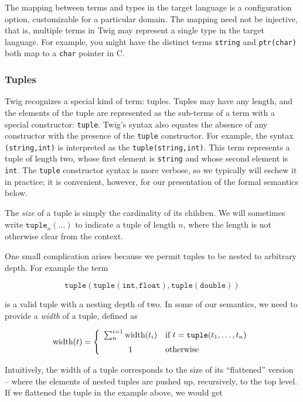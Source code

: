 The mapping between terms and types in the target language is a
configuration option, customizable for a particular domain. The
mapping need not be injective, that is, multiple terms in Twig may
represent a single type in the target language. For example, you
might have the distinct terms \texttt{string} and
\texttt{ptr(char)} both map to a \texttt{char} pointer in C.

\subsubsection{Tuples}

Twig recognizes a special kind of term: tuples. Tuples may have
any length, and the elements of the tuple are represented as the
sub-terms of a term with a special constructor: \texttt{tuple}.
Twig's syntax also equates the absence of any constructor with the
presence of the \texttt{tuple} constructor. For example, the
syntax \texttt{(string,int)} is interpreted as the
\texttt{tuple(string,int)}. This term represents a tuple of length
two, whose first element is \texttt{string} and whose second
element is \texttt{int}. The \texttt{tuple} constructor syntax is
more verbose, so we typically will eschew it in practice; it is
convenient, however, for our presentation of the formal semantics
below.

The \emph{size} of a tuple is simply the cardinality of its
children. We will sometimes write $\mathtt{tuple}_n(\ldots)$ to
indicate a tuple of length $n$, where the length is not otherwise
clear from the context.

One small complication arises because we permit tuples to be nested to arbitrary depth. For example the term

\[
\mathtt{tuple(tuple(int,float),tuple(double))} 
\]

is a valid tuple with a nesting depth of two. In some of our semantics, we need to provide a \emph{width} of a tuple, defined as 

\[
\mbox{width}(t) = \left\{
  \begin{array}{cl}
    \sum^{i=1}_{n} \mbox{width}(t_i) 
      & \mbox{if } t = \mathtt{tuple}(t_1,\ldots,t_n)\vspace{2mm}\\
    1 & \mbox{otherwise}
  \end{array}
\right.
\]

Intuitively, the width of a tuple corresponds to the size of its ``flattened'' version -- where the elements of nested tuples are pushed up, recursively, to the top level. If we flattened the tuple in the example above, we would get

